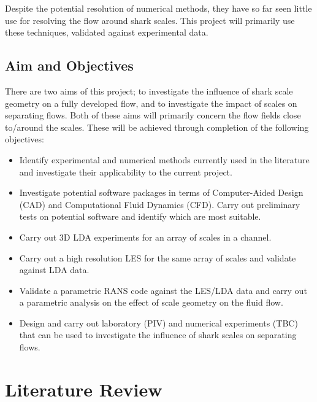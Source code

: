\documentclass[12pt,oneside,a4paper]{article}
\begin{document}
Despite the potential resolution of numerical methods, they have so far seen little use for resolving the flow around shark scales. This project will primarily use these techniques, validated against experimental data.

\subsection{Aim and Objectives}
\label{section:AandO}

There are two aims of this project; to investigate the influence of shark scale geometry on a fully developed flow, and to investigate the impact of scales on separating flows. Both of these aims will primarily concern the flow fields close to/around the scales. These will be achieved through completion of the following objectives:
\begin{itemize}
\itemsep0em

\item Identify experimental and numerical methods currently used in the literature and investigate their applicability to the current project.

\item Investigate potential software packages in terms of Computer-Aided Design (CAD) and Computational Fluid Dynamics (CFD). Carry out preliminary tests on potential software and identify which are most suitable. 

\item Carry out 3D LDA experiments for an array of scales in a channel.

\item Carry out a high resolution LES for the same array of scales and validate against LDA data. 

\item Validate a parametric RANS code against the LES/LDA data and carry out a parametric analysis on the effect of scale geometry on the fluid flow. 

\item Design and carry out laboratory (PIV) and numerical experiments (TBC) that can be used to investigate the influence of shark scales on separating flows.  

\end{itemize}

\newpage
\section{Literature Review}
\label{section:literatureReview}
\end{document}
